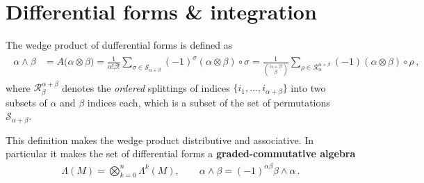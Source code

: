 \documentclass[../geometry_main.tex]{subfiles}
\begin{document}
\chapter{Differential forms \& integration} 


\begin{mytheorem}
The wedge product of dufferential forms is defined as
{\small\begin{align}
\begin{aligned}
    \alpha\wedge\beta &= A\Big(\alpha\otimes\beta\Big)
    =
    \tfrac{1}{\alpha!\beta!}\sum_{\sigma\in \mathcal{S}_{\alpha+\beta}}(-1)^{\sigma}(\alpha\otimes\beta)\circ \sigma
    =
    \tfrac{1}{\binom{\alpha+\beta}{\beta}}\sum_{\rho\in\mathcal{R}^{\alpha+\beta}_\alpha}(-1)(\alpha\otimes\beta)\circ\rho\,,
\end{aligned}
\end{align}}
where $\mathcal{R}^{\alpha+\beta}_{\beta}$ denotes the \emph{ordered} splittings of indices $\{i_1,\dots,i_{\alpha+\beta}\}$ into two subsets of $\alpha$ and $\beta$ indices each, which is a subset of the set of permutations $\mathcal{S}_{\alpha+\beta}$.

This definition makes the wedge product distributive and associative.
In particular it makes the set of differential forms a \textbf{graded-commutative algebra}
\begin{align}
    \Lambda(M)=\bigotimes_{k=0}^n\Lambda^k(M), \qquad \alpha\wedge\beta=(-1)^{\alpha\beta}\beta\wedge\alpha\,.
\end{align}
\end{mytheorem}
\end{document}
